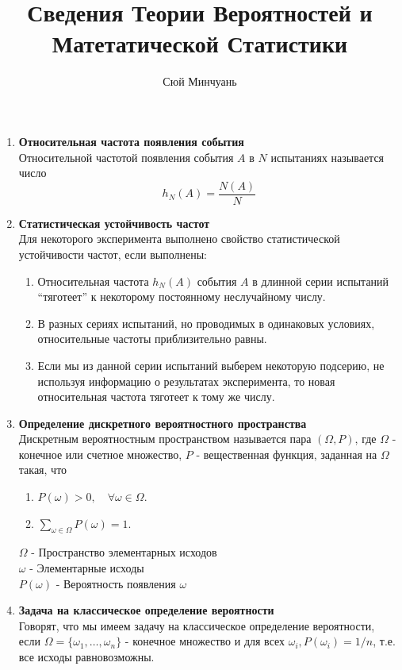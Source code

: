 \documentclass[A4]{article}
\begin{document}
	\author{Сюй Минчуань}
	\title{Сведения Теории Вероятностей и\\Матетатической Статистики}
	\maketitle
\begin{enumerate}
	\item \textbf{Относительная частота появления события} \\
	Относительной частотой появления события $A$ в $N$ испытаниях называется число 
	\begin{equation}
	h_N(A)=\frac{N(A)}{N}
	\end{equation}
	\item \textbf{Статистическая устойчивость частот}\\
	Для некоторого эксперимента выполнено свойство статистической устойчивости частот, если выполнены:
	\begin{enumerate}
		\item Относительная частота $h_N(A)$ события $A$ в длинной серии испытаний ``тяготеет'' к некоторому постоянному неслучайному числу.
		\item В разных сериях испытаний, но проводимых в одинаковых условиях, относительные частоты приблизительно равны.
		\item Если мы из данной серии испытаний выберем некоторую подсерию, не используя информацию о результатах эксперимента, то новая относительная частота тяготеет к тому же числу.
	\end{enumerate}
	\item \textbf{Определение дискретного вероятностного пространства}\\
	Дискретным вероятностным пространством называется пара $(\Omega,P)$, где $\Omega$ - конечное или счетное множество, $P$ - вещественная функция, заданная на $\Omega$ такая, что
	\begin{enumerate}
		\item $P(\omega)>0,\quad \forall \omega\in\Omega$.
		\item $\sum_{\omega\in\Omega} P(\omega)=1$.
	\end{enumerate}
	$\Omega$ - Пространство элементарных исходов\\
	$\omega$ - Элементарные исходы\\
	$P(\omega)$ - Вероятность появления $\omega$
	\item \textbf{Задача на классическое определение вероятности}\\
	Говорят, что мы имеем задачу на классическое определение вероятности, если $\Omega=\{\omega_1,\ldots,\omega_n\}$ - конечное множество и для всех $\omega_i,P(\omega_i)=1/n$, т.е. все исходы равновозможны.

\end{enumerate}
\end{document}
